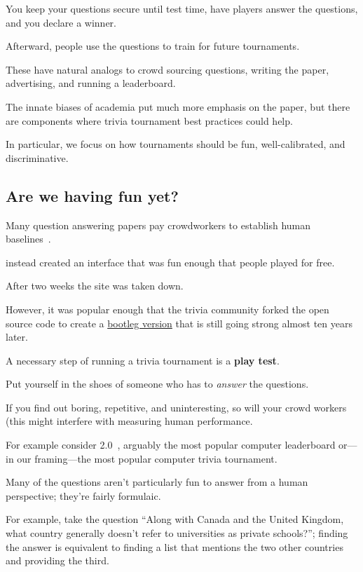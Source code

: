 You keep your questions secure until test time, have players answer the questions, and you declare a winner. 

Afterward, people use the questions to train for future tournaments.

These have natural analogs to crowd sourcing questions, writing the paper, advertising, and running a leaderboard. 

The innate biases of academia put much more emphasis on the paper, but there are components where trivia tournament best practices could help. 

In particular, we focus on how tournaments should be fun, well-calibrated, and discriminative.

\subsection{Are we having fun yet?}
\label{sec:fun}

Many question answering papers pay crowdworkers to establish human baselines~\citep{rajpurkar-16,choi-18}.

 instead created an interface that was fun enough that people played for free.

After two weeks the site was taken down.

However, it was popular enough that the trivia community forked the open source code to create a \href{https://protobowl.com/}{bootleg version} that is still going strong almost ten years later.

A necessary step of running a trivia tournament is a {\bf play test}.

Put yourself in the shoes of someone who has to \emph{answer} the questions.

If you find out boring, repetitive, and uninteresting, so will your crowd workers (this might interfere with measuring human performance. 

For example consider \squad{} 2.0~\citep{rajpurkar-18}, arguably the most popular computer  leaderboard or---in our framing---the most popular computer trivia tournament.

Many of the questions aren't particularly fun to answer from a human perspective; they're fairly formulaic.  

For example, take the question ``Along with Canada and the United Kingdom, what country generally doesn't refer to universities as private schools?''; finding the answer is equivalent to finding a list that mentions the two other countries and providing the third.

